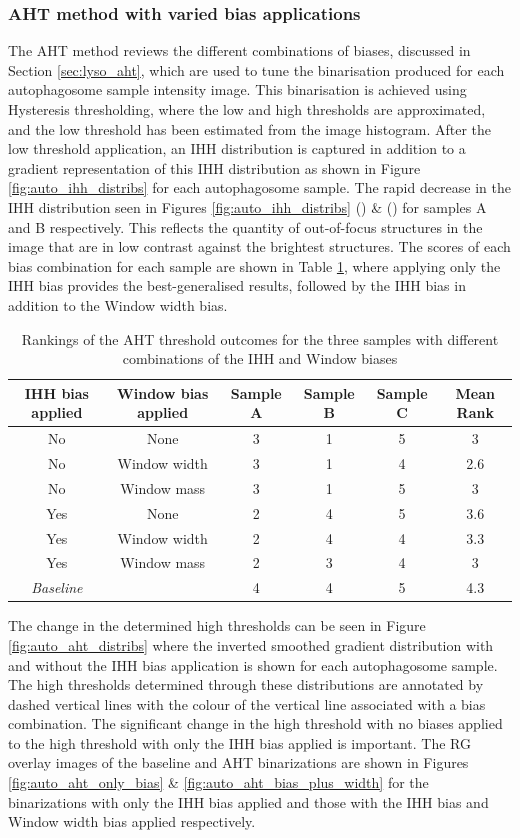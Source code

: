 \subsubsection{AHT method with varied bias applications}
The AHT method reviews the different combinations of biases, discussed in Section \ref{sec:lyso_aht}, which are used to tune the binarisation produced for each autophagosome sample intensity image. This binarisation is achieved using Hysteresis thresholding, where the low and high thresholds are approximated, and the low threshold has been estimated from the image histogram. After the low threshold application, an IHH distribution is captured in addition to a gradient representation of this IHH distribution as shown in Figure \ref{fig:auto_ihh_distribs} for each autophagosome sample. The rapid decrease in the IHH distribution seen in Figures \ref{fig:auto_ihh_distribs} () \& () for samples A and B respectively. This reflects the quantity of out-of-focus structures in the image that are in low contrast against the brightest structures. The scores of each bias combination for each sample are shown in Table \ref{tab:auto_aht}, where applying only the IHH bias provides the best-generalised results, followed by the IHH bias in addition to the Window width bias. 

\begin{table}
	\centering
	\begin{tabular}{|c|c|c|c|c|c|}
		\hline
		IHH bias applied & Window bias applied & Sample A & Sample B & Sample C & Mean Rank \\
		\hline
		No & None & 3 & 1 & 5 & 3 \\
		\hline
		No & Window width & 3 & 1 & 4 & 2.6 \\
		\hline
		No & Window mass & 3 & 1 & 5 & 3 \\
		\hline
		Yes & None & 2 & 4 & 5 & 3.6 \\
		\hline
		Yes & Window width & 2 & 4 & 4 & 3.3 \\
		\hline
		Yes & Window mass & 2 & 3 & 4 & 3 \\
		\hline
		\textit{Baseline} & & 4 & 4 & 5 & 4.3 \\
		\hline
	\end{tabular}
	\caption{Rankings of the AHT threshold outcomes for the three samples with different combinations of the IHH and Window biases}
	\label{tab:auto_aht}
\end{table}

The change in the determined high thresholds can be seen in Figure \ref{fig:auto_aht_distribs} where the inverted smoothed gradient distribution with and without the IHH bias application is shown for each autophagosome sample. The high thresholds determined through these distributions are annotated by dashed vertical lines with the colour of the vertical line associated with a bias combination. The significant change in the high threshold with no biases applied to the high threshold with only the IHH bias applied is important. The RG overlay images of the baseline and AHT binarizations are shown in Figures \ref{fig:auto_aht_only_bias}  \& \ref{fig:auto_aht_bias_plus_width} for the binarizations with only the IHH bias applied and those with the IHH bias and Window width bias applied respectively.
